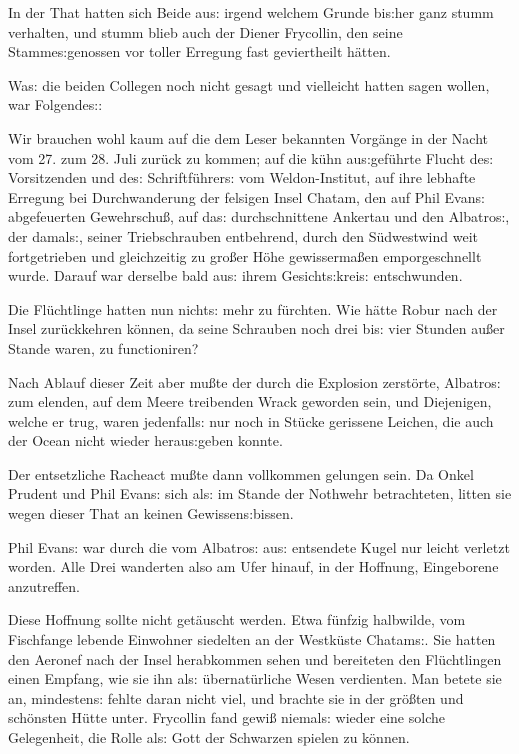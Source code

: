 \documentclass[oneside,12pt]{book}
\newcommand{\s}{s:}
\begin{document}
In der That hatten sich Beide au{\s} irgend welchem Grunde bi{\s}her
ganz stumm verhalten, und stumm blieb auch der Diener Frycollin, den
seine Stamme{\s}genossen vor toller Erregung fast geviertheilt
h\"atten.

Wa{\s} die beiden Collegen noch nicht gesagt und vielleicht hatten
sagen wollen, war Folgende{\s}:

Wir brauchen wohl kaum auf die dem Leser bekannten Vorg\"ange in der
Nacht vom 27. zum 28. Juli zur\"uck zu kommen; auf die k\"uhn
au{\s}gef\"uhrte Flucht de{\s} Vorsitzenden und de{\s}
Schriftf\"uhrer{\s} vom Weldon-Institut, auf ihre lebhafte Erregung
bei Durchwanderung der felsigen Insel Chatam, den auf Phil Evan{\s}
abgefeuerten Gewehrschu{\ss}, auf da{\s} durchschnittene Ankertau und
den {\glqq}Albatro{\s}{\grqq}, der damal{\s}, seiner Triebschrauben
entbehrend, durch den S\"udwestwind weit fortgetrieben und
gleichzeitig zu gro{\ss}er H\"ohe gewisserma{\ss}en emporgeschnellt
wurde. Darauf war derselbe bald au{\s} ihrem Gesicht{\s}krei{\s}
entschwunden.

Die Fl\"uchtlinge hatten nun nicht{\s} mehr zu f\"urchten. Wie
h\"atte Robur nach der Insel zur\"uckkehren k\"onnen, da seine
Schrauben noch drei bi{\s} vier Stunden au{\ss}er Stande waren, zu
functioniren?

Nach Ablauf dieser Zeit aber mu{\ss}te der durch die Explosion
zerst\"orte, {\glqq}Albatro{\s}{\grqq} zum elenden, auf dem Meere
treibenden Wrack geworden sein, und Diejenigen, welche er trug, waren
jedenfall{\s} nur noch in St\"ucke gerissene Leichen, die auch der
Ocean nicht wieder herau{\s}geben konnte.

Der entsetzliche Racheact mu{\ss}te dann vollkommen gelungen sein. Da
Onkel Prudent und Phil Evan{\s} sich al{\s} im Stande der Nothwehr
betrachteten, litten sie wegen dieser That an keinen
Gewissen{\s}bissen.

Phil Evan{\s} war durch die vom {\glqq}Albatro{\s}{\grqq} au{\s}
entsendete Kugel nur leicht verletzt worden. Alle Drei wanderten also
am Ufer hinauf, in der Hoffnung, Eingeborene anzutreffen.

Diese Hoffnung sollte nicht get\"auscht werden. Etwa f\"unfzig
halbwilde, vom Fischfange lebende Einwohner siedelten an der
Westk\"uste Chatam{\s}. Sie hatten den Aeronef nach der Insel
herabkommen sehen und bereiteten den Fl\"uchtlingen einen Empfang,
wie sie ihn al{\s} \"ubernat\"urliche Wesen verdienten. Man betete
sie an, mindesten{\s} fehlte daran nicht viel, und brachte sie in der
gr\"o{\ss}ten und sch\"onsten H\"utte unter. Frycollin fand gewi{\ss}
niemal{\s} wieder eine solche Gelegenheit, die Rolle al{\s} Gott der
Schwarzen spielen zu k\"onnen.
\end{document}
